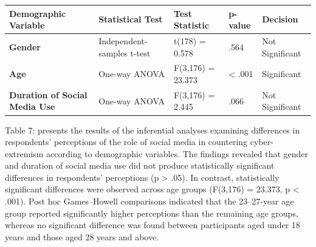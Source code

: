 \documentclass[10pt]{NSP1}
\makeatletter
\newcommand\jltx@wideopen{\par\addvspace{\medskipamount}\noindent}
\newcommand\jltx@wideclose{\par\addvspace{\medskipamount}}
\newenvironment{jltxspan}
  {\if@twocolumn\let\jltx@spannext\strip\else\let\jltx@spannext\jltx@wideopen\fi\jltx@spannext}
  {\if@twocolumn\let\jltx@spanend\endstrip\else\let\jltx@spanend\jltx@wideclose\fi\jltx@spanend}
\newcommand\JLTXaboveplacement{\par\addvspace{6pt plus 2pt minus 2pt}\noindent}
\newcommand\JLTXbelowplacement{\par\addvspace{6pt plus 2pt minus 2pt}}
\makeatother
\begin{document}
\JLTXaboveplacement \begin{jltxspan}%
\noindent\begin{minipage}{\linewidth}%
\centering
{\small
\begin{tabular}{|>{\centering\arraybackslash}p{}|>{\centering\arraybackslash}p{}|>{\centering\arraybackslash}p{}|>{\raggedright\arraybackslash}p{}|>{\centering\arraybackslash}p{}|}
\hline
\cellcolor[HTML]{DDD9C3}\textbf{Demographic Variable} & \cellcolor[HTML]{DDD9C3}\textbf{Statistical Test} & \cellcolor[HTML]{DDD9C3}\textbf{Test Statistic} & \cellcolor[HTML]{DDD9C3}\textbf{p-value} & \cellcolor[HTML]{DDD9C3}\textbf{Decision} \\
\hline
\cellcolor[HTML]{DDD9C3}\textbf{Gender} & Independent-samples t-test & t(178) = 0.578 & .564 & Not Significant \\
\hline
\cellcolor[HTML]{DDD9C3}\textbf{Age} & One-way ANOVA & F(3,176) = 23.373 & \textless{} .001 & Significant \\
\hline
\cellcolor[HTML]{DDD9C3}\textbf{Duration of Social Media Use} & One-way ANOVA & F(3,176) = 2.445 & .066 & Not Significant \\
\hline
\end{tabular}}
%
\end{minipage}%
\end{jltxspan}\JLTXbelowplacement 

Table 7: presents the results of the inferential analyses examining differences in respondents' perceptions of the role of social media in countering cyber-extremism according to demographic variables. The findings revealed that gender and duration of social media use did not produce statistically significant differences in respondents' perceptions (p \textgreater{} .05). In contrast, statistically significant differences were observed across age groups (F(3,176) = 23.373, p \textless{} .001). Post hoc Games–Howell comparisons indicated that the 23–27-year age group reported significantly higher perceptions than the remaining age groups, whereas no significant difference was found between participants aged under 18 years and those aged 28 years and above.
\end{document}
